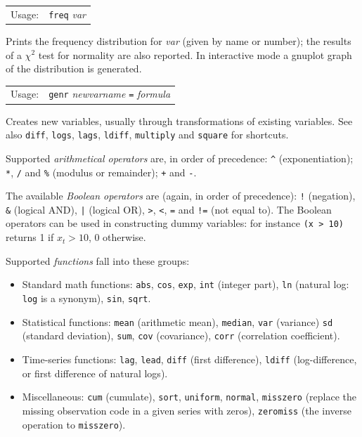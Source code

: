 \documentclass{article}
\begin{document}
{

\begin{tabular}{ll}
Usage:  &  \texttt{freq} \textit{var} 
\end{tabular}

Prints the frequency distribution for \textit{var} (given by name or
number); the results of a $\chi^2$ test for normality are also
reported.  In interactive mode a gnuplot graph of the distribution is
generated.  


\begin{tabular}{ll}
Usage: &  \texttt{genr} \textit{newvarname} \texttt{=} \textit{formula}
\end{tabular}

Creates new variables, usually through transformations of existing
variables. See also \texttt{diff}, \texttt{logs}, \texttt{lags},
\texttt{ldiff}, \texttt{multiply} and \texttt{square} for shortcuts.

Supported \textit{arithmetical operators} are, in order of precedence:
\verb+^+ (exponentiation); \texttt{*}, \texttt{/} and \verb+%+ (modulus or
remainder); \texttt{+} and \texttt{-}.

The available \textit{Boolean operators} are (again, in order of
precedence): \texttt{!} (negation), \verb+&+ (logical AND), \texttt{|}
(logical OR), \texttt{>}, \texttt{<}, \texttt{=} and \texttt{!=} (not
equal to).  The Boolean operators can be used in constructing dummy
variables: for instance \texttt{(x > 10)} returns 1 if $x_t > 10$, 0
otherwise.

Supported \textit{functions} fall into these groups:

\begin{itemize}
\item Standard math functions: \texttt{abs}, \texttt{cos},
  \texttt{exp}, \texttt{int} (integer part), \texttt{ln} (natural log:
  \texttt{log} is a synonym), \texttt{sin}, \texttt{sqrt}.
\item Statistical functions: \texttt{mean} (arithmetic mean),
  \texttt{median}, \texttt{var} (variance) \texttt{sd} (standard
  deviation), \texttt{sum}, \texttt{cov} (covariance), \texttt{corr}
  (correlation coefficient).
\item Time-series functions: \texttt{lag}, \texttt{lead},
  \texttt{diff} (first difference), \texttt{ldiff} (log-difference, or
  first difference of natural logs).
\item Miscellaneous: \texttt{cum} (cumulate), \texttt{sort},
  \texttt{uniform}, \texttt{normal}, \texttt{misszero} (replace the
  missing observation code in a given series with zeros),
  \texttt{zeromiss} (the inverse operation to \texttt{misszero}).
\end{itemize}

}
\end{document}
